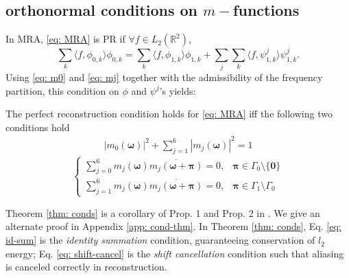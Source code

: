 \subsection{orthonormal conditions on $m-$functions}
In MRA, \eqref{eq: MRA} is PR if $\forall f\in L_2(\mathbb{R}^2)$,
\begin{equation}
\textstyle \sum_k\langle f,\phi_{0,k}\rangle\phi_{0,k} = \sum_k\langle f,\phi_{1,k}\rangle\phi_{1,k} + \sum_j\sum_k\langle f,\psi^{j}_{1,k}\rangle\psi^j_{1,k}.\label{eq: PR}
\end{equation}
Using \eqref{eq: m0} and \eqref{eq: mj} together with the admissibility of the frequency partition, this condition on $\phi$ and $\psi^j$'s yields:
\begin{thm}\label{thm: conds}
The perfect reconstruction condition holds for \eqref{eq: MRA} iff the following two conditions hold
\begin{align}\label{eq: id-sum}
|m_0(\boldsymbol{\omega})|^2 + \sum_{j = 1}^6|m_j(\boldsymbol{\omega})|^2 = 1
\end{align}
\begin{equation}\label{eq: shift-cancel}
 \begin{cases}
\sum_{j = 0}^6m_j(\boldsymbol{\omega})\overline{m_j(\boldsymbol{\omega} + \boldsymbol{\pi})} = 0, & \boldsymbol{\pi}\in \Gamma_0\setminus\{\boldsymbol{0}\}\\[.5em]
\sum_{j=1}^6m_j(\boldsymbol{\omega})\overline{m_j(\boldsymbol{\omega}+\boldsymbol{\pi})} = 0, & \boldsymbol{\pi}\in\Gamma_1\setminus\Gamma_0
\end{cases}
\end{equation}
\end{thm}

Theorem \ref{thm: conds} is a corollary of Prop. 1 and Prop. 2 in \cite{durand2007}. We give an alternate proof in Appendix \ref{app: cond-thm}.
In Theorem \ref{thm: conds}, Eq. \eqref{eq: id-sum} is the {\it identity summation} condition, guaranteeing conservation of $l_2$ energy; Eq. \eqref{eq: shift-cancel} is the {\it shift cancellation} condition such that aliasing is canceled correctly in reconstruction. %

